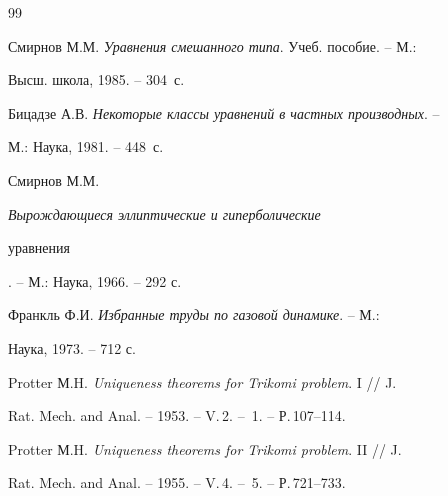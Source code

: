 \begin{thebibliography}{99}


Смирнов М.М. {\em Уравнения смешанного типа}. Учеб. пособие. -- М.: 


Высш. школа, 1985. -- 304~с. 




Бицадзе А.В. {\em Некоторые классы уравнений в частных производных}. -- 


М.: Наука, 1981. -- 448~с. 




Смирнов М.М. {\em Вырождающиеся эллиптические и гиперболические 


уравнения}. -- М.: Наука, 1966. -- 292 с. 




Франкль Ф.И. {\em Избранные труды по газовой динамике}. -- М.: 


Наука, 1973. -- 712 с. 




Protter М.H. {\em Uniqueness theorems for Trikomi problem}. I // J. 


Rat. Mech. and Anal. -- 1953. -- V.\,2. -- \No\,1. -- Р.\,107--114. 




Protter М.H. {\em Uniqueness theorems for Trikomi problem}. II // J. 


Rat. Mech. and Anal. -- 1955. -- V.\,4. -- \No\,5. -- Р.\,721--733. 


 


\end{thebibliography} 


 


\vskip 2cm 


 






\smallskip 






 


\label{end} 


 


